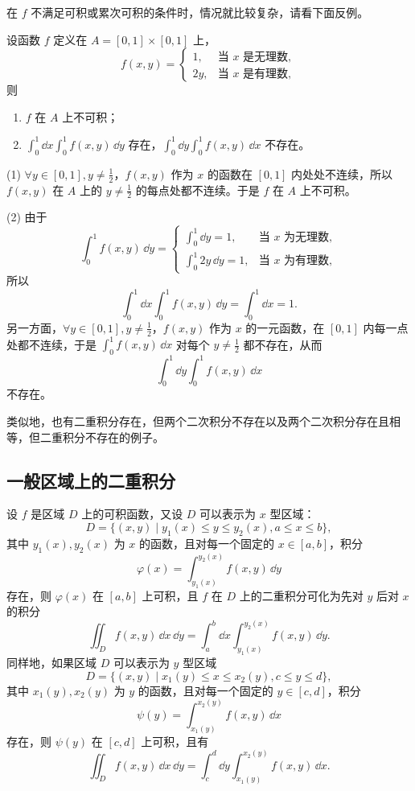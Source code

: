 在 $f$ 不满足可积或累次可积的条件时，情况就比较复杂，请看下面反例。

\begin{xexample}[22.2.2]
设函数 $f$ 定义在 $A=[0,1]\times[0,1]$ 上，
\[
  f(x,y)=
  \begin{cases}
    1, & \text{当 }x\text{ 是无理数},\\
    2y, & \text{当 }x\text{ 是有理数},
  \end{cases}
\]
则
\begin{enumerate}[label=(\arabic*)]
  \item $f$ 在 $A$ 上不可积；
  \item $\displaystyle\int_0^1\dd x\int_0^1f(x,y)\,\dd y$ 存在，$\displaystyle\int_0^1\dd y\int_0^1f(x,y)\,\dd x$ 不存在。
\end{enumerate}
\end{xexample}
\begin{xproof}
(1) $\forall y\in[0,1],y\ne\frac12$，$f(x,y)$ 作为 $x$ 的函数在 $[0,1]$ 内处处不连续，所以 $f(x,y)$ 在 $A$ 上的 $y\ne\frac12$ 的每点处都不连续。于是 $f$ 在 $A$ 上不可积。

(2) 由于
\[
  \int_0^1f(x,y)\,\dd y=
  \begin{cases}
    \displaystyle\int_0^1\dd y=1, & \text{当 }x\text{ 为无理数},\\
    \displaystyle\int_0^1 2y\,\dd y=1, & \text{当 }x\text{ 为有理数},
  \end{cases}
\]
所以
\[
  \int_0^1\dd x\int_0^1f(x,y)\,\dd y=\int_0^1\dd x=1.
\]
另一方面，$\forall y\in[0,1],y\ne\frac12$，$f(x,y)$ 作为 $x$ 的一元函数，在 $[0,1]$ 内每一点处都不连续，于是 $\int_0^1f(x,y)\,\dd x$ 对每个 $y\ne\frac12$ 都不存在，从而
\[
  \int_0^1\dd y\int_0^1f(x,y)\,\dd x
\]
不存在。
\end{xproof}

类似地，也有二重积分存在，但两个二次积分不存在以及两个二次积分存在且相等，但二重积分不存在的例子。

\subsection{一般区域上的二重积分}

设 $f$ 是区域 $D$ 上的可积函数，又设 $D$ 可以表示为 $x$ 型区域：
\[
  D=\{(x,y)\mid y_1(x)\le y\le y_2(x),a\le x\le b\},
\]
其中 $y_1(x),y_2(x)$ 为 $x$ 的函数，且对每一个固定的 $x\in[a,b]$，积分
\[
  \varphi(x)=\int_{y_1(x)}^{y_2(x)}f(x,y)\,\dd y
\]
存在，则 $\varphi(x)$ 在 $[a,b]$ 上可积，且 $f$ 在 $D$ 上的二重积分可化为先对 $y$ 后对 $x$ 的积分
\[
  \iint_D f(x,y)\,\dd x\,\dd y
  =\int_a^b\dd x\int_{y_1(x)}^{y_2(x)}f(x,y)\,\dd y.
\]
同样地，如果区域 $D$ 可以表示为 $y$ 型区域
\[
  D=\{(x,y)\mid x_1(y)\le x\le x_2(y),c\le y\le d\},
\]
其中 $x_1(y),x_2(y)$ 为 $y$ 的函数，且对每一个固定的 $y\in[c,d]$，积分
\[
  \psi(y)=\int_{x_1(y)}^{x_2(y)}f(x,y)\,\dd x
\]
存在，则 $\psi(y)$ 在 $[c,d]$ 上可积，且有
\[
  \iint_D f(x,y)\,\dd x\,\dd y
  =\int_c^d\dd y\int_{x_1(y)}^{x_2(y)}f(x,y)\,\dd x.
\]

